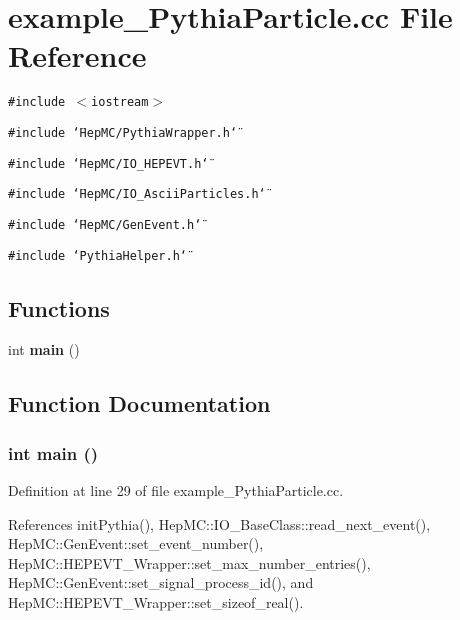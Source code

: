 \section{example\_\-Pythia\-Particle.cc File Reference}
\label{example__PythiaParticle_8cc}
{\tt \#include $<$iostream$>$}\par
{\tt \#include \char`\"{}Hep\-MC/Pythia\-Wrapper.h\char`\"{}}\par
{\tt \#include \char`\"{}Hep\-MC/IO\_\-HEPEVT.h\char`\"{}}\par
{\tt \#include \char`\"{}Hep\-MC/IO\_\-Ascii\-Particles.h\char`\"{}}\par
{\tt \#include \char`\"{}Hep\-MC/Gen\-Event.h\char`\"{}}\par
{\tt \#include \char`\"{}Pythia\-Helper.h\char`\"{}}\par
\subsection*{Functions}
\begin{CompactItemize}
\item 
int {\bf main} ()
\end{CompactItemize}


\subsection{Function Documentation}
\subsubsection{\setlength{\rightskip}{0pt plus 5cm}int main ()}\label{example__PythiaParticle_8cc_e66f6b31b5ad750f1fe042a706a4e3d4}




Definition at line 29 of file example\_\-Pythia\-Particle.cc.

References init\-Pythia(), Hep\-MC::IO\_\-Base\-Class::read\_\-next\_\-event(), Hep\-MC::Gen\-Event::set\_\-event\_\-number(), Hep\-MC::HEPEVT\_\-Wrapper::set\_\-max\_\-number\_\-entries(), Hep\-MC::Gen\-Event::set\_\-signal\_\-process\_\-id(), and Hep\-MC::HEPEVT\_\-Wrapper::set\_\-sizeof\_\-real().